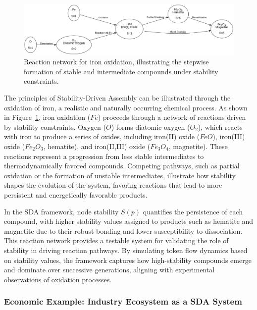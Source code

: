 \documentclass[preprint,12pt]{elsarticle}
\begin{document}
\begin{figure}[h]
    \centering
    \includegraphics[width=1\textwidth,height=0.4\textwidth]{figure_6.png}
    \caption{Reaction network for iron oxidation, illustrating the stepwise formation of stable and intermediate compounds under stability constraints.}
    \label{fig:figure_6}
\end{figure}

The principles of Stability-Driven Assembly can be illustrated through the oxidation of iron, a realistic and naturally occurring chemical process. As shown in Figure~\ref{fig:figure_6}, iron oxidation (\(Fe\)) proceeds through a network of reactions driven by stability constraints. Oxygen (\(O\)) forms diatomic oxygen (\(O_2\)), which reacts with iron to produce a series of oxides, including iron(II) oxide (\(FeO\)), iron(III) oxide (\(Fe_2O_3\), hematite), and iron(II,III) oxide (\(Fe_3O_4\), magnetite). These reactions represent a progression from less stable intermediates to thermodynamically favored compounds. Competing pathways, such as partial oxidation or the formation of unstable intermediates, illustrate how stability shapes the evolution of the system, favoring reactions that lead to more persistent and energetically favorable products.

In the SDA framework, node stability \(S(p)\) quantifies the persistence of each compound, with higher stability values assigned to products such as hematite and magnetite due to their robust bonding and lower susceptibility to dissociation. This reaction network provides a testable system for validating the role of stability in driving reaction pathways. By simulating token flow dynamics based on stability values, the framework captures how high-stability compounds emerge and dominate over successive generations, aligning with experimental observations of oxidation processes.

\subsubsection{Economic Example: Industry Ecosystem as a SDA System}
\end{document}
